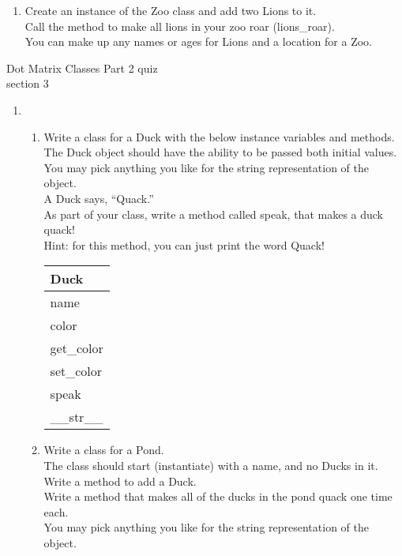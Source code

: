 \documentclass{article}
\begin{document}
\begin{enumerate}
\begin{enumerate}
		\item
			Create an instance of the Zoo class and add two Lions to it.\\
			Call the method to make all lions in your zoo roar (lions\_roar).\\
			You can make up any names or ages for Lions and a location for a Zoo.\\
	\end{enumerate}
\pagebreak

\end{enumerate}
\pagebreak
Dot Matrix \hfill Classes Part 2 quiz\\
section 3\\
\begin{enumerate}

	\item
	\begin{enumerate}
		\item
			Write a class for a Duck with the below instance variables and methods. \\ 
			The Duck object should have the ability to be passed both initial values.\\  
			You may pick anything you like for the string representation of the object.\\
			A Duck says, ``Quack.''\\  
			As part of your class, write a method called speak, that makes a duck quack!\\
			Hint: for this method, you can just print the word Quack!
			\begin{flushright}
			\begin{tabular}{|l|}
				\hline
				Duck\\ \hline
				name\\	color\\	 \hline
				get\_color \\ set\_color \\ speak \\ \_\_str\_\_ \\ \hline
			\end{tabular}
			\end{flushright}

		\item
			Write a class for a Pond. \\
			The class should start (instantiate) with a name, and no Ducks in it. \\ 
			Write a method to add a Duck.\\
			Write a method that makes all of the ducks in the pond quack one time each.\\
			You may pick anything you like for the string representation of the object.
	

\end{enumerate}
\end{enumerate}
\end{document}
